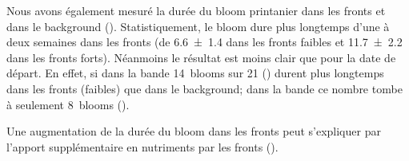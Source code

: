 Nous avons également mesuré la durée du bloom printanier dans les fronts et dans le background ().
Statistiquement, le bloom dure plus longtemps d'une à deux semaines dans les fronts (de \qty{6.6 \pm 1.4}{\jours} dans les fronts faibles et \qty{11.7 \pm 2.2}{\jours} dans les fronts forts).
Néanmoins le résultat est moins clair que pour la date de départ.
En effet, si dans la bande  14~blooms sur 21 () durent plus longtemps dans les fronts (faibles) que dans le background; dans la bande  ce nombre tombe à seulement 8~blooms ().

\begin{figure}
  \centering
  \label{fig:duree-bloom}
\end{figure}

Une augmentation de la durée du bloom dans les fronts peut s'expliquer par l'apport supplémentaire en nutriments par les fronts (\cite{simoes-sousa_2022}).


